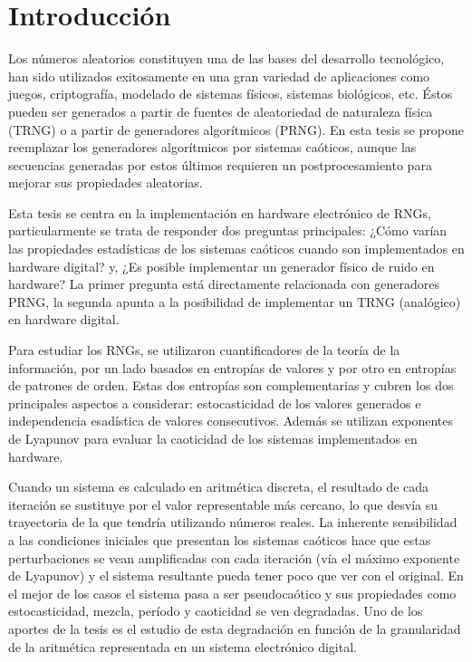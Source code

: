 \chapter{Introducción}

Los números aleatorios constituyen una de las bases del desarrollo tecnológico, han sido utilizados exitosamente en una gran variedad de aplicaciones como juegos, criptografía, modelado de sistemas físicos, sistemas biológicos, etc.
Éstos pueden ser generados a partir de fuentes de aleatoriedad de naturaleza física (TRNG) o a partir de generadores algorítmicos (PRNG).
En esta tesis se propone reemplazar los generadores algorítmicos por sistemas caóticos, aunque las secuencias generadas por estos últimos requieren un postprocesamiento para mejorar sus propiedades aleatorias.

Esta tesis se centra en la implementación en hardware electrónico de RNGs, particularmente se trata de responder dos preguntas principales: ¿Cómo varían las propiedades estadísticas de los sistemas caóticos cuando son implementados en hardware digital? y, ¿Es posible implementar un generador físico de ruido en hardware?
La primer pregunta está directamente relacionada con generadores PRNG, la segunda apunta a la posibilidad de implementar un TRNG (analógico) en hardware digital.

Para estudiar los RNGs, se utilizaron cuantificadores de la teoría de la información, por un lado basados en entropías de valores y por otro en entropías de patrones de orden.
Estas dos entropías son complementarias y cubren los dos principales aspectos a considerar: estocasticidad de los valores generados e  independencia esadística de valores consecutivos.
Además se utilizan exponentes de Lyapunov para evaluar la caoticidad de los sistemas implementados en hardware.

Cuando un sistema es calculado en aritmética discreta, el resultado de cada iteración se sustituye por el valor representable más cercano, lo que desvía su trayectoria de la que tendría utilizando números reales.
La inherente sensibilidad a las condiciones iniciales que presentan los sistemas caóticos hace que estas perturbaciones se vean amplificadas con cada iteración (vía el máximo exponente de Lyapunov) y el sistema resultante pueda tener poco que ver con el original.
En el mejor de los casos el sistema pasa a ser pseudocaótico y sus propiedades como estocasticidad, mezcla, período y caoticidad se ven degradadas.
Uno de los aportes de la tesis es el estudio de esta degradación en función de la granularidad de la aritmética representada en un sistema electrónico digital.


